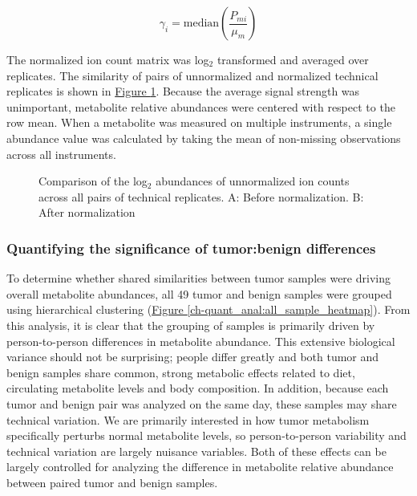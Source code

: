 \begin{equation}
\gamma_{i} = \text{median}\left(\frac{P_{mi}}{\mu_{m}}\right)
\label{ch-quant_anal:normal}
\end{equation}

The normalized ion count matrix was log$_{2}$ transformed and averaged over replicates.  The similarity of pairs of unnormalized and normalized technical replicates is shown in \hyperref[ch-quant_anal:replicate_corr]{Figure \ref{ch-quant_anal:replicate_corr}}.  Because the average signal strength was unimportant, metabolite relative abundances were centered with respect to the row mean.  When a metabolite was measured on multiple instruments, a single abundance value was calculated by taking the mean of non-missing observations across all instruments.

\begin{figure}[h!]
\begin{center}
\hspace{1mm}

\caption[Comparison of the log$_{2}$ abundances of unnormalized ion counts for pairs of technical replicates]{Comparison of the log$_{2}$ abundances of unnormalized ion counts across all pairs of technical replicates.  A: Before normalization. B: After normalization}
\label{ch-quant_anal:replicate_corr}
\end{center}
\end{figure}

\subsubsection{Quantifying the significance of tumor:benign differences}

To determine whether shared similarities between tumor samples were driving overall metabolite abundances, all 49 tumor and benign samples were grouped using hierarchical clustering (\hyperref[ch-quant_anal:all_sample_heatmap]{Figure \ref{ch-quant_anal:all_sample_heatmap}}). From this analysis, it is clear that the grouping of samples is primarily driven by person-to-person differences in metabolite abundance.  This extensive biological variance should not be surprising; people differ greatly and both tumor and benign samples share common, strong metabolic effects related to diet, circulating metabolite levels and body composition.  In addition, because each tumor and benign pair was analyzed on the same day, these samples may share technical variation.  We are primarily interested in how tumor metabolism specifically perturbs normal metabolite levels, so person-to-person variability and technical variation are largely nuisance variables. Both of these effects can be largely controlled for analyzing the difference in metabolite relative abundance between paired tumor and benign samples. 

